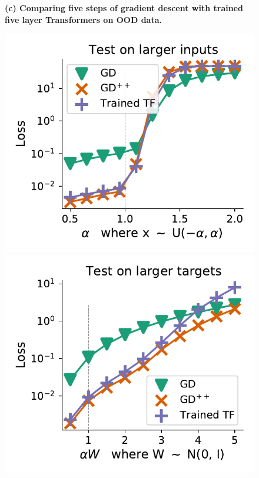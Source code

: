 \documentclass{article}
\theoremstyle{plain}
\theoremstyle{definition}
\theoremstyle{remark}
\begin{document}
\begin{figure}
\textbf{(c) Comparing five steps of gradient descent with trained five layer Transformers on OOD data.}
\begin{center}
\begin{minipage}{.24\textwidth}
  \centering
  \begin{center}
    \includegraphics[width=1.\textwidth]{Final_figures/linear/linear_five_layer/normal_13.pdf}
  \end{center}
  \vspace{-10pt}
\end{minipage}
\begin{minipage}{.24\textwidth}
  \centering
  \begin{center}
    \includegraphics[width=1.\textwidth]{Final_figures/linear/linear_five_layer/normal_11.pdf}

\end{center}
\end{minipage}
\end{center}
\end{figure}
\end{document}
